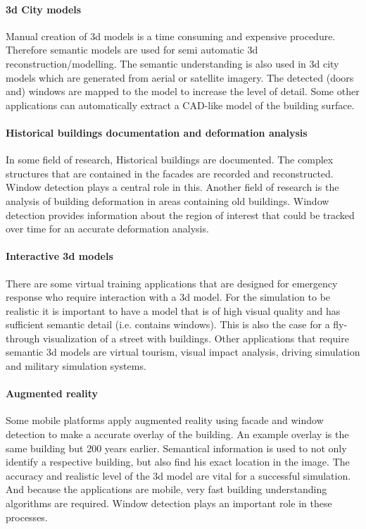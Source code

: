 \paragraph{3d City models} 
	Manual creation of 3d models is a time consuming and expensive procedure.
	Therefore semantic models are used for semi automatic 3d
	reconstruction/modelling.
	The semantic understanding is also used in 3d city models which are
	generated from aerial or satellite imagery.  The detected (doors and)
	windows are mapped to the model to increase the level of detail. 
	Some other applications can automatically extract a CAD-like model of
	the building surface.

\paragraph{Historical buildings documentation and deformation analysis}
	In some field of research, Historical buildings are documented. The complex
	structures that are contained in the facades are recorded and reconstructed.
	Window detection plays a central role in this. 
	Another field of research is the analysis of building deformation in areas
	containing old buildings.  Window detection provides information about the
	region of interest that could be tracked over time for an accurate
	deformation analysis.


\paragraph{Interactive 3d models}
	There are some virtual training applications that are designed for
	emergency response who require interaction with a 3d model.  
	For the simulation to be realistic it is important to have a model that is
	of high visual quality and has sufficient semantic detail (i.e. contains
	windows).  This is also the case for a fly-through visualization of a street with
	buildings.
	Other applications that require semantic 3d models are virtual tourism,
	visual impact analysis, driving simulation and military simulation systems.

\paragraph{Augmented reality}
	Some mobile platforms apply augmented reality using facade and window
	detection to make a accurate overlay of the building. An example overlay is the
	same building but 200 years earlier.  Semantical information is used to not
	only identify a respective building, but also find his exact location in the
	image.  The accuracy and realistic level of the 3d model are vital for a
	successful simulation.  And because the applications are mobile, very fast
	building understanding algorithms are required.  Window
	detection plays an important role in these processes.

